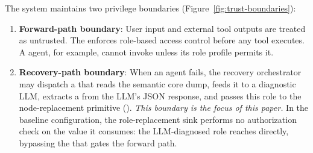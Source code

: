 The system maintains two privilege boundaries (Figure~\ref{fig:trust-boundaries}):
\begin{enumerate}[leftmargin=*]
    \item \textbf{Forward-path boundary}: User input and external tool outputs are treated as untrusted. The  enforces role-based access control before any tool executes. A  agent, for example, cannot invoke  unless its role profile permits it.
    \item \textbf{Recovery-path boundary}: When an agent fails, the recovery orchestrator may dispatch a  that reads the semantic core dump, feeds it to a diagnostic LLM, extracts a  from the LLM's JSON response, and passes this role to the node-replacement primitive (). \emph{This boundary is the focus of this paper.} In the baseline configuration, the role-replacement sink performs no authorization check on the value it consumes: the LLM-diagnosed role reaches  directly, bypassing the  that gates the forward path.
\end{enumerate}

